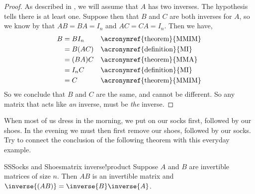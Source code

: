 \begin{proof}
As described in , we will assume that $A$ has two inverses.  The hypothesis tells there is at least one.  Suppose then that $B$ and $C$ are both inverses for $A$, so we know by  that $AB=BA=I_n$ and $AC=CA=I_n$.  Then we have,
%
\begin{align*}
B
&=BI_n&&\text{\acronymref{theorem}{MMIM}}\\
&=B(AC)&&\text{\acronymref{definition}{MI}}\\
&=(BA)C&&\text{\acronymref{theorem}{MMA}}\\
&=I_nC&&\text{\acronymref{definition}{MI}}\\
&=C&&\text{\acronymref{theorem}{MMIM}}\\
\end{align*}
%
So we conclude that $B$ and $C$ are the same, and cannot be different.  So any matrix that acts like {\em an} inverse, must be {\em the} inverse.
\end{proof}
%
When most of us dress in the morning, we put on our socks first, followed by our shoes.  In the evening we must then first remove our shoes, followed by our socks.  Try to connect the conclusion of the following theorem with this everyday example.
%
\begin{theorem}{SS}{Socks and Shoes}{matrix inverse!product}
Suppose $A$ and $B$ are invertible matrices of size $n$.  Then $AB$ is an invertible matrix and $\inverse{(AB)}=\inverse{B}\inverse{A}$.
\end{theorem}
%
